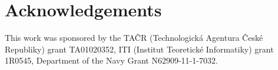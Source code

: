 \section*{Acknowledgements}
This work was sponsored by the
TA\v{C}R (Technologick\'{a} Agentura \v{C}esk\'{e} Republiky)
grant TA01020352, ITI (Institut Teoretick\'{e} Informatiky) grant 1R0545, Department of the Navy Grant N62909-11-1-7032.


% 
